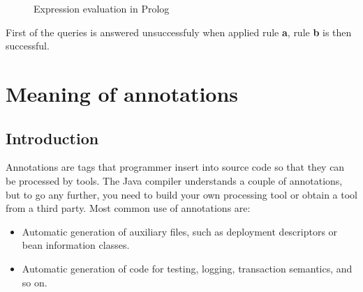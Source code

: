 \documentclass[11pt,twoside,a4paper]{book}
\begin{document}
\setlength{\parskip}{1cm plus4mm minus3mm}


\begin{figure}[ht]
\caption{Expression evaluation in Prolog}

\end{figure}



First of the queries is answered unsuccessfuly when applied rule \textbf{a},
rule \textbf{b} is then successful.


\chapter{Meaning of annotations}

\section{Introduction}
Annotations are tags that programmer insert into source code so that they
can be processed by tools. The Java compiler understands a couple of
annotations, but to go any further, you need to build your own processing tool
or obtain a tool from a third party. Most common use of annotations are:

\begin{itemize}
  \item Automatic generation of auxiliary files, such as deployment descriptors or bean information classes.
  \item Automatic generation of code for testing, logging, transaction semantics, and so on.
\end{itemize}
\end{document}
